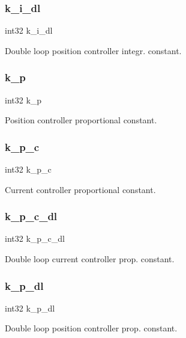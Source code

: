 \subsubsection{k\+\_\+i\+\_\+dl}
{\footnotesize\ttfamily int32 k\+\_\+i\+\_\+dl}

Double loop position controller integr. constant. \mbox{\label{structst__motor_ad1bc394122aa9760c3fc2887a1891cd8}} 
\subsubsection{k\+\_\+p}
{\footnotesize\ttfamily int32 k\+\_\+p}

Position controller proportional constant. \mbox{\label{structst__motor_ac3311db4a733f35aa5ed2672cb162f96}} 
\subsubsection{k\+\_\+p\+\_\+c}
{\footnotesize\ttfamily int32 k\+\_\+p\+\_\+c}

Current controller proportional constant. \mbox{\label{structst__motor_a63c3f3c01d6757cafdb40043adce404e}} 
\subsubsection{k\+\_\+p\+\_\+c\+\_\+dl}
{\footnotesize\ttfamily int32 k\+\_\+p\+\_\+c\+\_\+dl}

Double loop current controller prop. constant. \mbox{\label{structst__motor_a047226f308f4365d9d0036d71b6ed910}} 
\subsubsection{k\+\_\+p\+\_\+dl}
{\footnotesize\ttfamily int32 k\+\_\+p\+\_\+dl}

Double loop position controller prop. constant. \mbox{\label{structst__motor_a14fe3ed96d232dced2d33efc493a0667}} 
